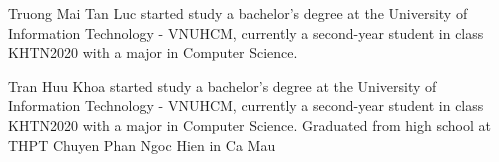 \begin{IEEEbiography}{Truong Mai Tan Luc}
started study a bachelor's degree at the University of Information Technology - VNUHCM, currently a second-year student in class KHTN2020 with a major in Computer Science.
\end{IEEEbiography}
\begin{IEEEbiography}{Tran Huu Khoa}
started study a bachelor's degree at the University of Information Technology - VNUHCM, currently a second-year student in class KHTN2020 with a major in Computer Science. Graduated from high school at THPT Chuyen Phan Ngoc Hien in Ca Mau
\end{IEEEbiography}







\vfill







